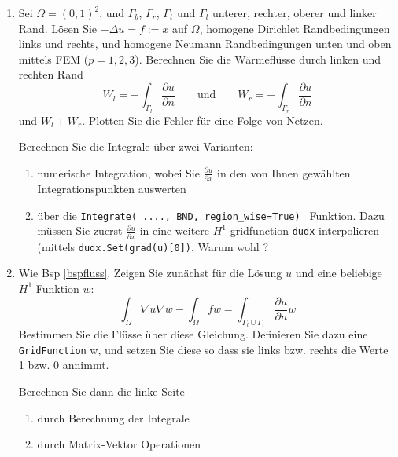 \documentclass[11pt,a4paper]{report}
\begin{document}
\begin{enumerate}
\item \label{bspfluss} Sei $\Omega =(0,1)^2$, und $\Gamma_b$, $\Gamma_r$, $\Gamma_t$ und
  $\Gamma_l$ unterer, rechter, oberer und linker Rand. L\"osen Sie
  $-\Delta u = f := x$ auf $\Omega$, homogene Dirichlet Randbedingungen
  links und rechts, und homogene Neumann Randbedingungen unten und
  oben mittels FEM ($p=1,2,3$). Berechnen Sie die W\"armefl\"usse durch linken und
  rechten Rand
$$
W_l = - \int_{\Gamma_l} \frac{\partial u}{\partial n} \qquad \text{und} \qquad
W_r = - \int_{\Gamma_r} \frac{\partial u}{\partial n}
$$
und $W_l+W_r$. Plotten Sie die Fehler f\"ur eine Folge von Netzen.

Berechnen Sie die Integrale \"uber zwei Varianten:
\begin{enumerate}
\item numerische Integration, wobei Sie $\frac{\partial u}{\partial
    x}$ in den von Ihnen gew\"ahlten Integrationspunkten auswerten
\item \"uber die {\tt Integrate( ...., BND, region\_wise=True) }
  Funktion. Dazu m\"ussen Sie zuerst $\frac{\partial u}{\partial x}$ in eine weitere
  $H^1$-gridfunction {\tt dudx} interpolieren (mittels {\tt dudx.Set(grad(u)[0])}. Warum wohl ?
\end{enumerate}

\vspace{15pt}


\item Wie Bsp \ref{bspfluss}. Zeigen Sie zun\"achst f\"ur die L\"osung
  $u$ und eine beliebige $H^1$ Funktion $w$:
$$
\int_\Omega \nabla u \nabla w - \int_\Omega f w = \int_{\Gamma_l \cup
  \Gamma_r}  \frac{\partial u}{\partial n} w
$$
Bestimmen Sie die Fl\"usse \"uber diese Gleichung. Definieren Sie dazu
eine {\tt GridFunction} w, und setzen Sie diese so dass sie links
bzw. rechts die Werte 1 bzw. 0 annimmt.

Berechnen Sie dann die linke Seite
\begin{enumerate}
\item durch Berechnung der Integrale
\item durch Matrix-Vektor Operationen 
\end{enumerate}

\end{enumerate}
\end{document}
